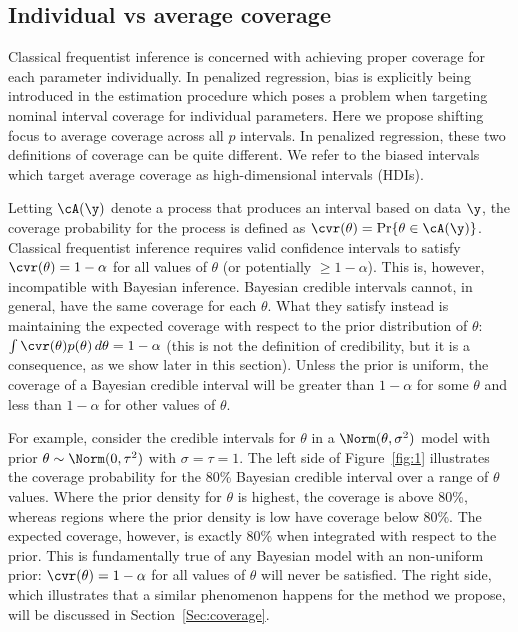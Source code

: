 \subsection{Individual vs average coverage}
\label{Sec:IAC}

Classical frequentist inference is concerned with achieving proper coverage for each parameter individually. In penalized regression, bias is explicitly being introduced in the estimation procedure which poses a problem when targeting nominal interval coverage for individual parameters. Here we propose shifting focus to average coverage across all $p$ intervals. In penalized regression, these two definitions of coverage can be quite different. We refer to the biased intervals which target average coverage as high-dimensional intervals (HDIs).

Letting $\cA(\y)$ denote a process that produces an interval based on data $\y$, the coverage probability for the process is defined as $\cvr(\theta) = \Pr\{\theta \in \cA(\y)\}$. Classical frequentist inference requires valid confidence intervals to satisfy $\cvr(\theta) = 1 - \alpha$ for all values of $\theta$ (or potentially $\ge 1 - \alpha$). This is, however, incompatible with Bayesian inference. Bayesian credible intervals cannot, in general, have the same coverage for each $\theta$. What they satisfy instead is maintaining the expected coverage with respect to the prior distribution of $\theta$: $\int \cvr(\theta)p(\theta) \, d\theta = 1 - \alpha$ (this is not the definition of credibility, but it is a consequence, as we show later in this section). Unless the prior is uniform, the coverage of a Bayesian credible interval will be greater than $1-\alpha$ for some $\theta$ and less than $1-\alpha$ for other values of $\theta$.

For example, consider the credible intervals for $\theta$ in a $\Norm(\theta, \sigma^2)$ model with prior $\theta \sim \Norm(0, \tau^2)$ with $\sigma = \tau = 1$. The left side of Figure~\ref{fig:1} illustrates the coverage probability for the 80\% Bayesian credible interval over a range of $\theta$ values. Where the prior density for $\theta$ is highest, the coverage is above 80\%, whereas regions where the prior density is low have coverage below 80\%. The expected coverage, however, is exactly 80\% when integrated with respect to the prior. This is fundamentally true of any Bayesian model with an non-uniform prior: $\cvr(\theta) = 1 - \alpha$ for all values of $\theta$ will never be satisfied. The right side, which illustrates that a similar phenomenon happens for the method we propose, will be discussed in Section~\ref{Sec:coverage}.

